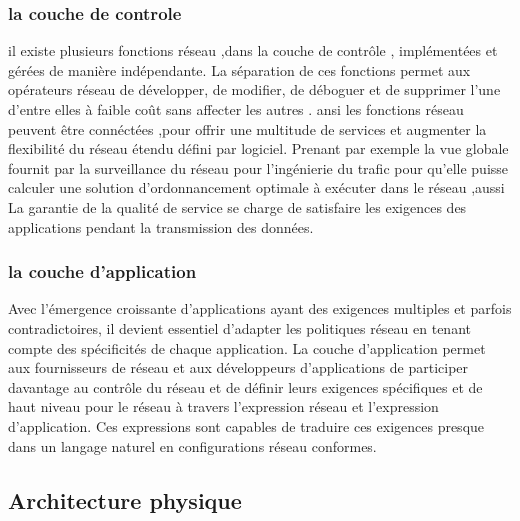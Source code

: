 	\subsubsection{    	la couche de controle}
	il existe plusieurs fonctions réseau ,dans la couche de contrôle ,  implémentées et gérées de manière indépendante. La séparation de ces fonctions permet aux opérateurs réseau de développer, de modifier, de déboguer et de supprimer l'une d'entre elles à faible coût sans affecter les autres . ansi les fonctions réseau peuvent être connéctées ,pour offrir une multitude de services et augmenter la flexibilité du réseau étendu défini par logiciel. Prenant par exemple la vue globale fournit par la surveillance du réseau pour l'ingénierie du trafic pour qu’elle puisse calculer une solution d'ordonnancement optimale à exécuter dans le réseau ,aussi La garantie de la qualité de service se charge de satisfaire les exigences des applications pendant la transmission des données. 

	\subsubsection{  la couche d’application }
Avec l'émergence croissante d'applications ayant des exigences multiples et parfois contradictoires, il devient essentiel d'adapter les politiques réseau en tenant compte des spécificités de chaque application.
La couche d’application permet aux fournisseurs de réseau et aux développeurs d'applications de participer davantage au contrôle du réseau et de définir leurs exigences spécifiques et de haut niveau pour le réseau à travers l'expression réseau et l'expression d'application. Ces expressions sont capables de traduire ces exigences presque dans un langage naturel en configurations réseau conformes. 
\subsection{Architecture physique }

